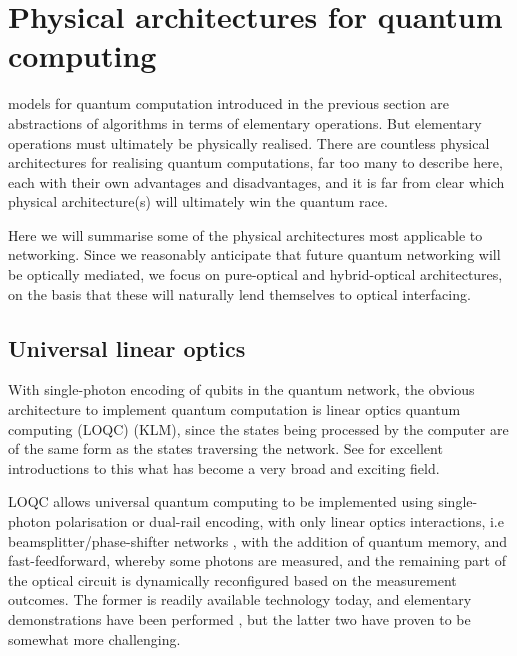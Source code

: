 %
%

\section{Physical architectures for quantum computing} \label{sec:archs_QC} 

 models for quantum computation introduced in the previous section are abstractions of algorithms in terms of elementary operations. But elementary operations must ultimately be physically realised. There are countless physical architectures for realising quantum computations, far too many to describe here, each with their own advantages and disadvantages, and it is far from clear which physical architecture(s) will ultimately win the quantum race.

Here we will summarise some of the physical architectures most applicable to networking. Since we reasonably anticipate that future quantum networking will be optically mediated, we focus on pure-optical and hybrid-optical architectures, on the basis that these will naturally lend themselves to optical interfacing.

%
%

\subsection{Universal linear optics} \label{sec:KLM_univ} 

With single-photon encoding of qubits in the quantum network, the obvious architecture to implement quantum computation is linear optics quantum computing (LOQC) \cite{bib:KLM01} (KLM), since the states being processed by the computer are of the same form as the states traversing the network. See \cite{bib:Kok05, bib:KokLovettBook} for excellent introductions to this what has become a very broad and exciting field.

LOQC allows universal quantum computing to be implemented using single-photon polarisation or dual-rail encoding, with only linear optics interactions, i.e beamsplitter/phase-shifter networks \cite{bib:Reck94}, with the addition of quantum memory, and fast-feedforward, whereby some photons are measured, and the remaining part of the optical circuit is dynamically reconfigured based on the measurement outcomes. The former is readily available technology today, and elementary demonstrations have been performed \cite{bib:OBrien03, bib:UniversalLOOBrien}, but the latter two have proven to be somewhat more challenging.


